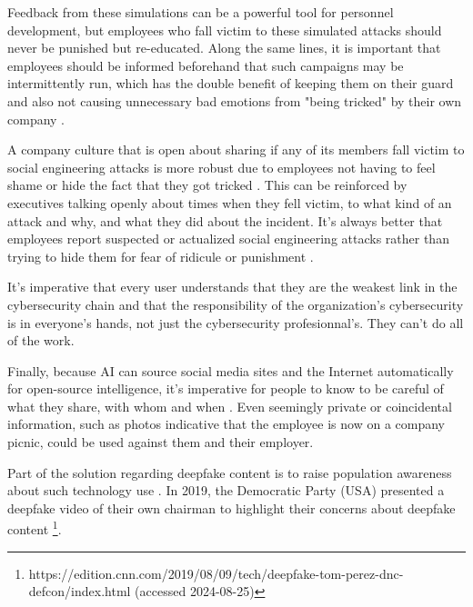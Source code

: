 Feedback from these simulations can be a powerful tool for personnel development, but employees who fall victim to these simulated attacks should never be punished but re-educated. Along the same lines, it is important that employees should be informed beforehand that such campaigns may be intermittently run, which has the double benefit of keeping them on their guard and also not causing unnecessary bad emotions from "being tricked" by their own company \citep{hadnagySocialEngineering2018, mitnick_The_Art_of_Deception_2003}.

A company culture that is open about sharing if any of its members fall victim to social engineering attacks is more robust due to employees not having to feel shame or hide the fact that they got tricked \citep{hadnagySocialEngineering2018}. This can be reinforced by executives talking openly about times when they fell victim, to what kind of an attack and why, and what they did about the incident. It's always better that employees report suspected or actualized social engineering attacks rather than trying to hide them for fear of ridicule or punishment \citep{mitnick_The_Art_of_Deception_2003}.

It's imperative that every user understands that they are the weakest link in the cybersecurity chain \citep{mitnick_The_Art_of_Deception_2003} and that the responsibility of the organization's cybersecurity is in everyone's hands, not just the cybersecurity profesionnal's. They can't do all of the work.


Finally, because AI can source social media sites and the Internet automatically for open-source intelligence, it's imperative for people to know to be careful of what they share, with whom and when \citep{mitnick_The_Art_of_Deception_2003}. Even seemingly private or coincidental information, such as photos indicative that the employee is now on a company picnic, could be used against them and their employer.

Part of the solution regarding deepfake content is to raise population awareness about such technology use \citep{blauthArtificialIntelligenceCrimeOverviewMaliciousUseAbuse2022}. In 2019, the Democratic Party (USA) presented a deepfake video of their own chairman to highlight their concerns about deepfake content \footnote{https://edition.cnn.com/2019/08/09/tech/deepfake-tom-perez-dnc-defcon/index.html (accessed 2024-08-25)}.